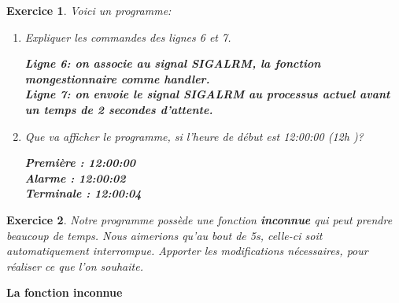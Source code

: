 \documentclass[9pt]{beamer}
\newenvironment{code}[1]{%
    \begin{bclogo}[couleur=backcolour, couleurTexte=black ,couleurBord=bleulapis ,couleurBarre=black, ombre=false,epBord=0.9,logo=\#,arrondi=0.1]{{\bfseries #1}}%
    }%
    {%
    \end{bclogo}
}%
\newtheorem{exercise}{Exercice}
\begin{document}


\begin{frame}
\begin{exercise}
Voici un programme:

\exii
 \begin{enumerate}
    \item Expliquer les commandes des lignes 6 et 7.
    
    \pause
    \textbf{Ligne 6: on associe au signal SIGALRM, la fonction mongestionnaire comme handler.}\\
    \textbf{Ligne 7: on envoie le signal SIGALRM au processus actuel avant un temps de 2 secondes d'attente.}
    \item Que va afficher le programme, si l'heure de début est 12:00:00 (12h )?
    
   \pause
    \textbf{Première : 12:00:00}\\
    \textbf{Alarme : 12:00:02}\\
    \textbf{Terminale : 12:00:04}\\
\end{enumerate}
\end{exercise}
\end{frame}


\begin{frame}
\begin{exercise}
Notre programme possède une fonction \textbf{inconnue} qui peut prendre beaucoup de temps. Nous aimerions qu'au bout de 5s, celle-ci soit automatiquement interrompue.
Apporter les modifications nécessaires, pour réaliser ce que l'on souhaite.
\end{exercise}
\begin{code}{La fonction inconnue}
   \parbox{10cm}{  \ex}
\end{code}
\end{frame}
\end{document}
